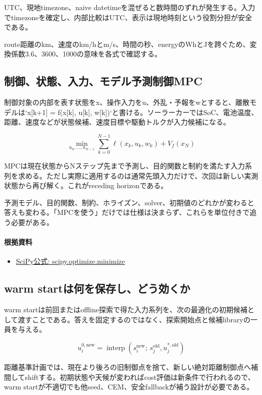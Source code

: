 \documentclass[a4paper,11pt]{article}
\begin{document}
UTC、現地timezone、naive datetimeを混ぜると数時間のずれが発生する。入力でtimezoneを確定し、内部比較はUTC、表示は現地時刻という役割分担が安全である。


route距離のkm、速度のkm/hとm/s、時間の秒、energyのWhとJを跨ぐため、変換係数3.6、3600、1000の意味を各式で確認する。



\subsection{制御、状態、入力、モデル予測制御MPC}
制御対象の内部を表す状態をx、操作入力をu、外乱・予報をwとすると、離散モデルは`x[k+1] = f(x[k], u[k], w[k])`と書ける。ソーラーカーではSoC、電池温度、距離、速度などが状態候補、速度目標や駆動トルクが入力候補になる。


\[
\min_{u_0,\ldots,u_{N-1}} \sum_{k=0}^{N-1}\ell(x_k,u_k,w_k)+V_f(x_N)
\]

MPCは現在状態からNステップ先まで予測し、目的関数と制約を満たす入力系列を求める。ただし実際に適用するのは通常先頭入力だけで、次回は新しい実測状態から再び解く。これがreceding horizonである。


予測モデル、目的関数、制約、ホライズン、solver、初期値のどれかが変わると答えも変わる。「MPCを使う」だけでは仕様は決まらず、これらを単位付きで追う必要がある。

\paragraph{根拠資料}
\begin{itemize}[leftmargin=1.6em]
\item \href{https://docs.scipy.org/doc/scipy/reference/generated/scipy.optimize.minimize.html}{SciPy公式: scipy.optimize.minimize}
\end{itemize}

\subsection{warm startは何を保存し、どう効くか}
warm startは前回またはoffline探索で得た入力系列を、次の最適化の初期候補として渡すことである。答えを固定するのではなく、探索開始点と候補libraryの一員を与える。


\[
u^{0,\mathrm{new}}_i=\operatorname{interp}\left(s_i^{\mathrm{new}};\,s_j^{\mathrm{old}},u_j^{\ast,\mathrm{old}}\right)
\]

距離基準計画では、現在より後ろの旧制御点を捨て、新しい絶対距離制御点へ補間してshiftする。初期状態や天候が変わればcost評価は新条件で行われるので、warm startが不適切でも他seed、CEM、安全fallbackが補う設計が必要である。
\end{document}
